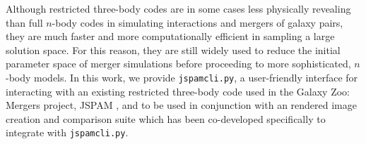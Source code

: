 Although restricted three-body codes are in some cases less physically revealing
than full $n$-body codes in simulating interactions and mergers of galaxy pairs,
they are much faster and more computationally efficient in sampling a large
solution space. For this reason, they are still widely used to reduce the
initial parameter space of merger simulations before proceeding to more
sophisticated, $n$-body models. In this work, we provide \texttt{jspamcli.py},
a user-friendly interface for interacting with an existing restricted
three-body code used in the Galaxy Zoo: Mergers project,
JSPAM \cite{Wallin2016}, and to be used in conjunction with an rendered
image creation and comparison suite which has been co-developed specifically
to integrate with \texttt{jspamcli.py}.
